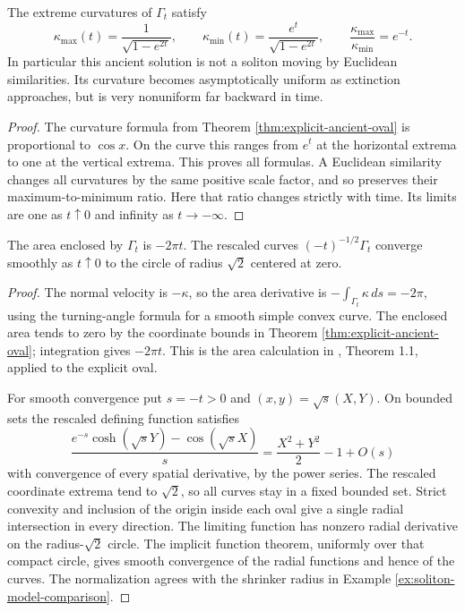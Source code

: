 \begin{proposition}\label{prop:ancient-oval-curvature-ratio}
The extreme curvatures of $\Gamma_t$ satisfy
\[
 \kappa_{\max}(t)=\frac1{\sqrt{1-e^{2t}}},\qquad
 \kappa_{\min}(t)=\frac{e^t}{\sqrt{1-e^{2t}}},\qquad
 \frac{\kappa_{\max}}{\kappa_{\min}}=e^{-t}.
\]
In particular this ancient solution is not a soliton moving by Euclidean similarities. Its curvature becomes asymptotically uniform as extinction approaches, but is very nonuniform far backward in time.
\end{proposition}
\begin{proof}
The curvature formula from Theorem \ref{thm:explicit-ancient-oval} is proportional to $\cos x$. On the curve this ranges from $e^t$ at the horizontal extrema to one at the vertical extrema. This proves all formulas. A Euclidean similarity changes all curvatures by the same positive scale factor, and so preserves their maximum-to-minimum ratio. Here that ratio changes strictly with time. Its limits are one as $t\uparrow0$ and infinity as $t\to-\infty$.
\end{proof}

\begin{proposition}\label{prop:ancient-oval-extinction-model}
The area enclosed by $\Gamma_t$ is $-2\pi t$. The rescaled curves $(-t)^{-1/2}\Gamma_t$ converge smoothly as $t\uparrow0$ to the circle of radius $\sqrt2$ centered at zero.
\end{proposition}
\begin{proof}
The normal velocity is $-\kappa$, so the area derivative is $-\int_{\Gamma_t}\kappa\,ds=-2\pi$, using the turning-angle formula for a smooth simple convex curve. The enclosed area tends to zero by the coordinate bounds in Theorem \ref{thm:explicit-ancient-oval}; integration gives $-2\pi t$. This is the area calculation in \cite{WhiMCF15}, Theorem 1.1, applied to the explicit oval.

For smooth convergence put $s=-t>0$ and $(x,y)=\sqrt s(X,Y)$. On bounded sets the rescaled defining function satisfies
\[
 \frac{e^{-s}\cosh(\sqrt sY)-\cos(\sqrt sX)}s
 =\frac{X^2+Y^2}{2}-1+O(s)
\]
with convergence of every spatial derivative, by the power series. The rescaled coordinate extrema tend to $\sqrt2$, so all curves stay in a fixed bounded set. Strict convexity and inclusion of the origin inside each oval give a single radial intersection in every direction. The limiting function has nonzero radial derivative on the radius-$\sqrt2$ circle. The implicit function theorem, uniformly over that compact circle, gives smooth convergence of the radial functions and hence of the curves. The normalization agrees with the shrinker radius in Example \ref{ex:soliton-model-comparison}.
\end{proof}


